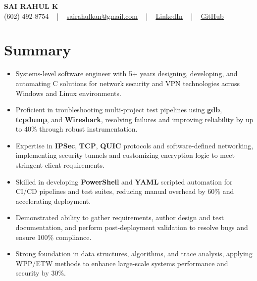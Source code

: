 \documentclass[letterpaper,11pt]{article}
\newcommand{\resumeItem}[1]{
  \item\footnotesize{
    {#1 \vspace{-2pt}}
  }
}
\newcommand{\resumeItemListStart}{\begin{itemize}[leftmargin=*]}
\newcommand{\resumeItemListEnd}{\end{itemize}\vspace{-5pt}}
\begin{document}
\begin{center}
    {\fontsize{14pt}{12pt}\selectfont \textbf{\MakeUppercase{Sai Rahul K}}}\\ \vspace{2pt}
    \fontsize{10pt}{12pt}\selectfont (602) 492-8754 ~ | ~ \href{mailto:sairahulkan@gmail.com}{sairahulkan@gmail.com} ~ | ~
    \href{https://www.linkedin.com/in/rq123/}{\color{blue}\underline{LinkedIn}} ~ | ~
    \href{https://github.com/kanrahuldo}{\color{blue}\underline{GitHub}}~
    \vspace{-8pt}
\end{center}

\section{Summary}
\fontsize{9pt}{10pt}\selectfont
\resumeItemListStart
    \resumeItem{Systems-level software engineer with 5+ years designing, developing, and automating C\+\+ solutions for network security and VPN technologies across Windows and Linux environments.}
    \resumeItem{Proficient in troubleshooting multi-project test pipelines using \textbf{gdb}, \textbf{tcpdump}, and \textbf{Wireshark}, resolving failures and improving reliability by up to 40\% through robust instrumentation.}
    \resumeItem{Expertise in \textbf{IPSec}, \textbf{TCP}, \textbf{QUIC} protocols and software-defined networking, implementing security tunnels and customizing encryption logic to meet stringent client requirements.}
    \resumeItem{Skilled in developing \textbf{PowerShell} and \textbf{YAML} scripted automation for CI/CD pipelines and test suites, reducing manual overhead by 60\% and accelerating deployment.}
    \resumeItem{Demonstrated ability to gather requirements, author design and test documentation, and perform post-deployment validation to resolve bugs and ensure 100\% compliance.}
    \resumeItem{Strong foundation in data structures, algorithms, and trace analysis, applying WPP/ETW methods to enhance large-scale systems performance and security by 30\%.}
\resumeItemListEnd
\vspace{-6pt}
\end{document}
